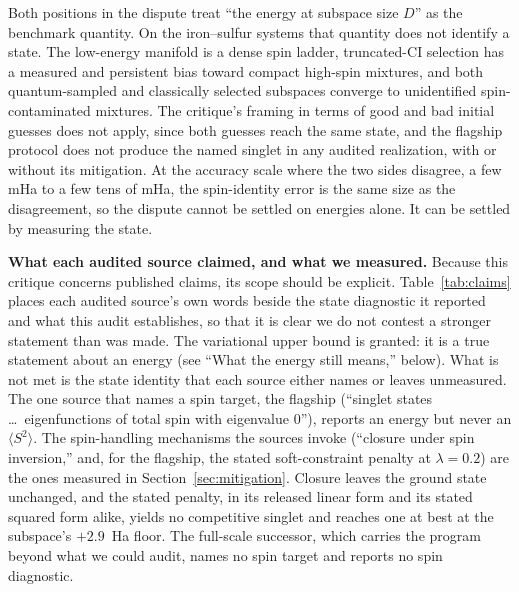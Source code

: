 \documentclass[11pt]{article}
\newcommand{\ssq}{\ensuremath{\langle S^2\rangle}}
\begin{document}
Both positions in the dispute treat ``the energy at subspace size $D$'' as the benchmark quantity. On the iron--sulfur systems that quantity does not identify a state. The low-energy manifold is a dense spin ladder, truncated-CI selection has a measured and persistent bias toward compact high-spin mixtures, and both quantum-sampled and classically selected subspaces converge to unidentified spin-contaminated mixtures. The critique's framing in terms of good and bad initial guesses does not apply, since both guesses reach the same state, and the flagship protocol does not produce the named singlet in any audited realization, with or without its mitigation. At the accuracy scale where the two sides disagree, a few mHa to a few tens of mHa, the spin-identity error is the same size as the disagreement, so the dispute cannot be settled on energies alone. It can be settled by measuring the state.

\textbf{What each audited source claimed, and what we measured.} Because this critique concerns published claims, its scope should be explicit. Table~\ref{tab:claims} places each audited source's own words beside the state diagnostic it reported and what this audit establishes, so that it is clear we do not contest a stronger statement than was made. The variational upper bound is granted: it is a true statement about an energy (see ``What the energy still means,'' below). What is not met is the state identity that each source either names or leaves unmeasured. The one source that names a spin target, the flagship (``singlet states \ldots\ eigenfunctions of total spin with eigenvalue 0''), reports an energy but never an \ssq{}. The spin-handling mechanisms the sources invoke (``closure under spin inversion,'' and, for the flagship, the stated soft-constraint penalty at $\lambda=0.2$) are the ones measured in Section~\ref{sec:mitigation}. Closure leaves the ground state unchanged, and the stated penalty, in its released linear form and its stated squared form alike, yields no competitive singlet and reaches one at best at the subspace's $+2.9$~Ha floor. The full-scale successor, which carries the program beyond what we could audit, names no spin target and reports no spin diagnostic.
\end{document}

